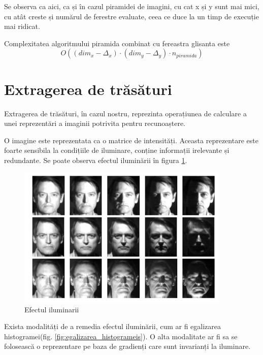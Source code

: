 Se observa ca aici, ca și în cazul piramidei de imagini, cu cat x și y sunt mai mici, cu atât creste și numărul de ferestre evaluate, ceea ce duce la un timp de execuție mai ridicat.

Complexitatea algoritmului piramida combinat cu fereastra glisanta este 
$${O((dim_x-\Delta_x) \cdot (dim_y-\Delta_y) \cdot n_{piramida})}$$

\pagebreak
\section{Extragerea de trăsături}

Extragerea de trăsături, în cazul nostru, reprezinta operațiunea de calculare a unei reprezentări a imaginii potrivita pentru recunoaștere.

O imagine este reprezentata ca o matrice de intensități.
Aceasta reprezentare este foarte sensibila la condițiile de iluminare, conține informații irelevante și redundante.
Se poate observa efectul iluminării în figura \ref{fig:efectul_iluminarii}.

\begin{figure}[H]
	\centering
		\includegraphics[width=0.90\textwidth]{imagini/efectul_iluminarii.png}
	\caption{Efectul iluminarii\protect\footnotemark}
	\label{fig:efectul_iluminarii}
\end{figure}


Exista modalități de a remedia efectul iluminării, cum ar fi egalizarea histogramei(fig. \ref{fig:egalizarea_histogrameis}).
O alta modalitate ar fi sa se folosească o reprezentare pe baza de gradienți care sunt invarianți la iluminare.


